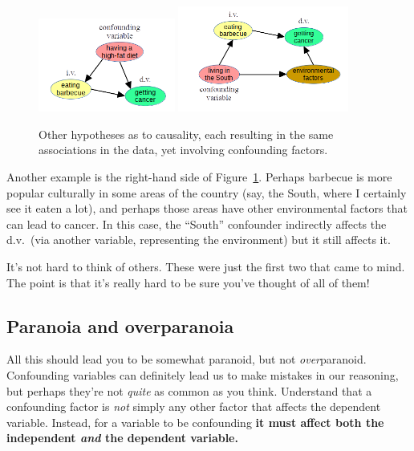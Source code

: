 \begin{figure}[ht]
\centering
\includegraphics[width=0.4\textwidth]{causalDiagram2.png}
\includegraphics[width=0.5\textwidth]{causalDiagram3.png}
\caption{Other hypotheses as to causality, each resulting in the same
associations in the data, yet involving confounding factors.}
\label{fig:causalDiagram23}
\end{figure}

Another example is the right-hand side of Figure~\ref{fig:causalDiagram23}.
Perhaps barbecue is more popular culturally in some areas of the country (say,
the South, where I certainly see it eaten a lot), and perhaps those areas have
other environmental factors that can lead to cancer. In this case, the
``South'' confounder indirectly affects the d.v.~(via another variable,
representing the environment) but it still affects it.

It's not hard to think of others. These were just the first two that came to
mind. The point is that it's really hard to be sure you've thought of all of
them!


\subsection{Paranoia and overparanoia}

All this should lead you to be somewhat paranoid, but not
\textit{over}paranoid. Confounding variables can definitely lead us to make
mistakes in our reasoning, but perhaps they're not \textit{quite} as common as
you think. Understand that a confounding factor is \textit{not} simply any
other factor that affects the dependent variable. Instead, for a variable to be
confounding \textbf{it must affect both the independent \textit{and} the
dependent variable.}

